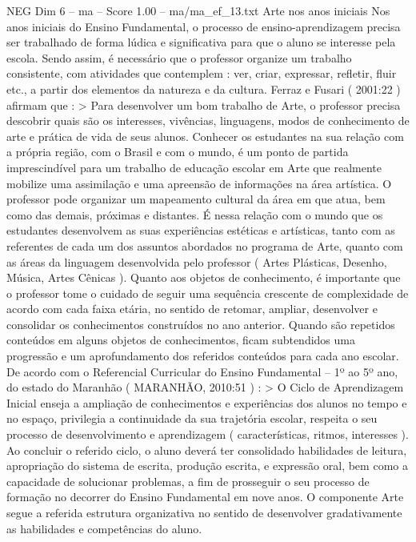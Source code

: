 \begin{textsample}{NEG Dim 6 – ma – Score 1.00 – ma/ma\_ef\_13.txt}  \label{ex:f6_neg_191}
Arte nos anos iniciais Nos anos iniciais do Ensino Fundamental, o processo de ensino-aprendizagem precisa ser trabalhado de forma lúdica e significativa para que o aluno se interesse pela escola.
Sendo assim, é necessário que o professor organize um trabalho consistente, com atividades que contemplem : ver, criar, expressar, refletir, fluir etc., a partir dos elementos da natureza e da cultura.
Ferraz e Fusari ( 2001:22 ) afirmam que : > Para desenvolver um bom trabalho de Arte, o professor precisa descobrir quais são os interesses, vivências, linguagens, modos de conhecimento de arte e prática de vida de seus alunos.
Conhecer os estudantes na sua relação com a própria região, com o Brasil e com o mundo, é um ponto de partida imprescindível para um trabalho de educação escolar em Arte que realmente mobilize uma assimilação e uma apreensão de informações na área artística.
O professor pode organizar um mapeamento cultural da área em que atua, bem como das demais, próximas e distantes.
É nessa relação com o mundo que os estudantes desenvolvem as suas experiências estéticas e artísticas, tanto com as referentes de cada um dos assuntos abordados no programa de Arte, quanto com as áreas da linguagem desenvolvida pelo professor ( Artes Plásticas, Desenho, Música, Artes Cênicas ).
Quanto aos objetos de conhecimento, é importante que o professor tome o cuidado de seguir uma sequência crescente de complexidade de acordo com cada faixa etária, no sentido de retomar, ampliar, desenvolver e consolidar os conhecimentos construídos no ano anterior.
Quando são repetidos conteúdos em alguns objetos de conhecimentos, ficam subtendidos uma progressão e um aprofundamento dos referidos conteúdos para cada ano escolar.
De acordo com o Referencial Curricular do Ensino Fundamental – 1º ao 5º ano, do estado do Maranhão ( MARANHÃO, 2010:51 ) : > O Ciclo de Aprendizagem Inicial enseja a ampliação de conhecimentos e experiências dos alunos no tempo e no espaço, privilegia a continuidade da sua trajetória escolar, respeita o seu processo de desenvolvimento e aprendizagem ( características, ritmos, interesses ).
Ao concluir o referido ciclo, o aluno deverá ter consolidado habilidades de leitura, apropriação do sistema de escrita, produção escrita, e expressão oral, bem como a capacidade de solucionar problemas, a fim de prosseguir o seu processo de formação no decorrer do Ensino Fundamental em nove anos.
O componente Arte segue a referida estrutura organizativa no sentido de desenvolver gradativamente as habilidades e competências do aluno.

\end{textsample}
